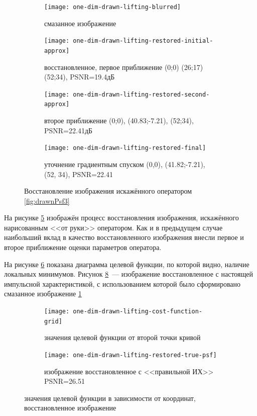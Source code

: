 \begin{figure}[h!]
	\centering
	\begin{subfigure}[t]{0.475\textwidth}
		\centering
		\texttt{[image: one-dim-drawn-lifting-blurred]}
		\caption{смазанное изображение}
		\label{fig:oneDimDrawnLiftingBlurred}
	\end{subfigure}
	\hfill
	\begin{subfigure}[t]{0.475\textwidth}
		\centering
		\texttt{[image: one-dim-drawn-lifting-restored-initial-approx]}
		\caption{восстановленное, первое приближение (0;0) (26;17) (52;34), PSNR=19.4дБ}
		\label{fig:oneDimDrawnLiftingInitial}
	\end{subfigure}


	\begin{subfigure}[t]{0.475\textwidth}
		\centering
		\texttt{[image: one-dim-drawn-lifting-restored-second-approx]}
		\caption{второе приближение (0;0), (40.83;-7.21), (52;34), PSNR=22.41дБ}
		\label{fig:oneDimDrawnLiftingSecond}
	\end{subfigure}
	\hfill
	\begin{subfigure}[t]{0.475\textwidth}
		\centering
		\texttt{[image: one-dim-drawn-lifting-restored-final]}
		\caption{уточнение градиентным спуском (0,0), (41.82;-7.21), (52, 34), PSNR=22.41}
		\label{fig:oneDimDrawnLiftingFinal}
	\end{subfigure}
	\caption{Восстановление изображения искажённого оператором \ref{fig:drawnPsf3}}
	\label{fig:oneDimDrawnLifting}
\end{figure}

На рисунке \ref{fig:oneDimDrawnLifting} изображён процесс восстановления изображения, искажённого нарисованным <<от руки>> оператором. Как и в предыдущем случае наибольший вклад в качество восстановленного изображения внесли первое и второе приближение оценки параметров оператора.

На рисунке \ref{fig:oneDimDrawnLiftingCostMatrix} показана диаграмма целевой функции, по которой видно, наличие локальных минимумов. Рисунок \ref{fig:oneDimDrawnLiftinfRealPsf}~--- изображение восстановленное с настоящей импульсной характеристикой, с использованием которой было сформировано смазанное изображение \ref{fig:oneDimDrawnLiftingBlurred}

\begin{figure}[h!]
	\centering
	\begin{subfigure}[t]{0.475\textwidth}
		\centering
		\texttt{[image: one-dim-drawn-lifting-cost-function-grid]}
		\caption{значения целевой функции от второй точки кривой}
		\label{fig:oneDimDrawnLiftingCostMatrix}
	\end{subfigure}
	\hfill
	\begin{subfigure}[t]{0.475\textwidth}
		\centering
		\texttt{[image: one-dim-drawn-lifting-restored-true-psf]}
		\caption{изображение восстановленное с <<правильной ИХ>> PSNR=26.51}
		\label{fig:oneDimDrawnLiftinfRealPsf}
	\end{subfigure}
	\caption{значения целевой функции в зависимости от координат, восстановленное изображение}
\end{figure}

